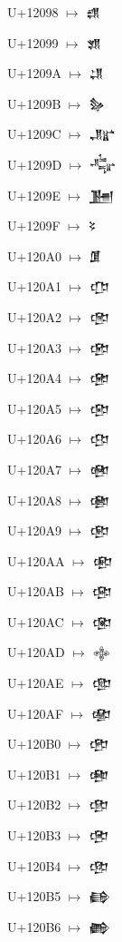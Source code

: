 {\noindent U+12098  $\mapsto$ {\cufont 𒂘}\par
\noindent U+12099  $\mapsto$ {\cufont 𒂙}\par
\noindent U+1209A  $\mapsto$ {\cufont 𒂚}\par
\noindent U+1209B  $\mapsto$ {\cufont 𒂛}\par
\noindent U+1209C  $\mapsto$ {\cufont 𒂜}\par
\noindent U+1209D  $\mapsto$ {\cufont 𒂝}\par
\noindent U+1209E  $\mapsto$ {\cufont 𒂞}\par
\noindent U+1209F  $\mapsto$ {\cufont 𒂟}\par
\noindent U+120A0  $\mapsto$ {\cufont 𒂠}\par
\noindent U+120A1  $\mapsto$ {\cufont 𒂡}\par
\noindent U+120A2  $\mapsto$ {\cufont 𒂢}\par
\noindent U+120A3  $\mapsto$ {\cufont 𒂣}\par
\noindent U+120A4  $\mapsto$ {\cufont 𒂤}\par
\noindent U+120A5  $\mapsto$ {\cufont 𒂥}\par
\noindent U+120A6  $\mapsto$ {\cufont 𒂦}\par
\noindent U+120A7  $\mapsto$ {\cufont 𒂧}\par
\noindent U+120A8  $\mapsto$ {\cufont 𒂨}\par
\noindent U+120A9  $\mapsto$ {\cufont 𒂩}\par
\noindent U+120AA  $\mapsto$ {\cufont 𒂪}\par
\noindent U+120AB  $\mapsto$ {\cufont 𒂫}\par
\noindent U+120AC  $\mapsto$ {\cufont 𒂬}\par
\noindent U+120AD  $\mapsto$ {\cufont 𒂭}\par
\noindent U+120AE  $\mapsto$ {\cufont 𒂮}\par
\noindent U+120AF  $\mapsto$ {\cufont 𒂯}\par
\noindent U+120B0  $\mapsto$ {\cufont 𒂰}\par
\noindent U+120B1  $\mapsto$ {\cufont 𒂱}\par
\noindent U+120B2  $\mapsto$ {\cufont 𒂲}\par
\noindent U+120B3  $\mapsto$ {\cufont 𒂳}\par
\noindent U+120B4  $\mapsto$ {\cufont 𒂴}\par
\noindent U+120B5  $\mapsto$ {\cufont 𒂵}\par
\noindent U+120B6  $\mapsto$ {\cufont 𒂶}\par
}
